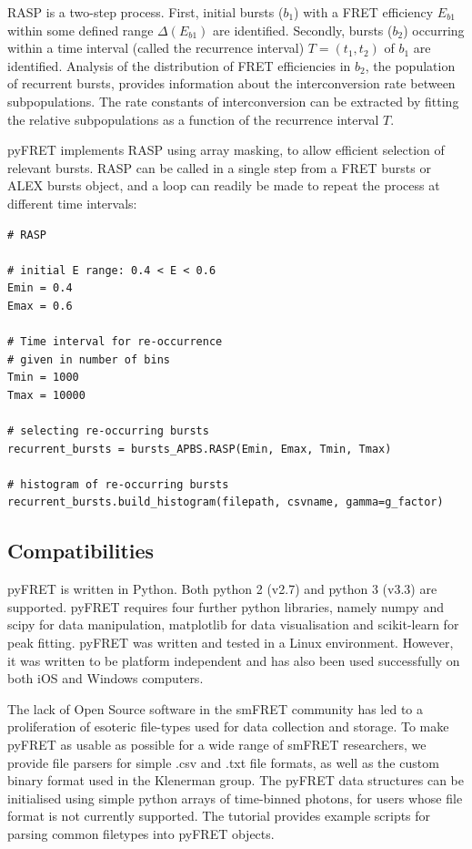 RASP is a two-step process. First, initial bursts ($b_1$) with a FRET efficiency $E_{b1}$ within some defined range $\Delta(E_{b1})$ are identified. Secondly, bursts ($b_2$) occurring within a time interval (called the recurrence interval) $T = (t_1, t_2)$ of $b_1$ are identified. Analysis of the distribution of FRET efficiencies in $b_2$, the population of recurrent bursts, provides information about the interconversion rate between subpopulations. The rate constants of interconversion can be extracted by fitting the relative subpopulations as a function of the recurrence interval $T$.

pyFRET implements RASP using array masking, to allow efficient selection of relevant bursts. RASP can be called in a single step from a FRET bursts or ALEX bursts object, and a loop can readily be made to repeat the process at different time intervals:

\begin{lstlisting}
# RASP

# initial E range: 0.4 < E < 0.6
Emin = 0.4
Emax = 0.6

# Time interval for re-occurrence
# given in number of bins
Tmin = 1000
Tmax = 10000

# selecting re-occurring bursts
recurrent_bursts = bursts_APBS.RASP(Emin, Emax, Tmin, Tmax)

# histogram of re-occurring bursts
recurrent_bursts.build_histogram(filepath, csvname, gamma=g_factor)
\end{lstlisting} 

\subsection{Compatibilities}
pyFRET is written in Python. Both python 2 (v2.7) and python 3 (v3.3) are supported. pyFRET requires four further python libraries, namely numpy and scipy for data manipulation, matplotlib for data visualisation and scikit-learn for peak fitting.  pyFRET was written and tested in a Linux environment. However, it was written to be platform independent and has also been used successfully on both iOS and Windows computers.

The lack of Open Source software in the smFRET community has led to a proliferation of esoteric file-types used for data collection and storage. To make pyFRET as usable as possible for a wide range of smFRET researchers, we provide file parsers for simple .csv and .txt file formats, as well as the custom binary format used in the Klenerman group. The pyFRET data structures can be initialised using simple python arrays of time-binned photons, for users whose file format is not currently supported. The tutorial provides example scripts for parsing common filetypes into pyFRET objects.

